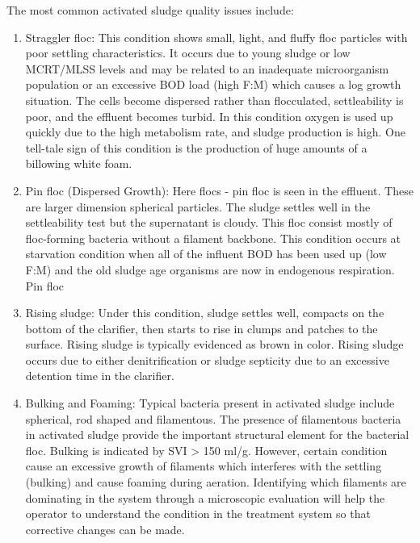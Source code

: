 \begin{itemize}


The most common activated sludge quality issues include:
\begin{enumerate}[1.]
\item Straggler floc:  This condition shows small, light, and fluffy floc particles with poor settling characteristics. It occurs due to young sludge or low MCRT/MLSS levels and may be related to an inadequate microorganism population or an excessive BOD load (high F:M) which causes a log growth situation. The cells become dispersed rather than flocculated, settleability is poor, and the effluent becomes turbid. In this condition oxygen is used up quickly due to the high metabolism rate, and sludge production is high. One tell-tale sign of this condition is the production of huge amounts of a billowing white foam.

\item Pin floc (Dispersed Growth):  Here flocs - pin floc is seen in the effluent. These are larger dimension spherical particles.  The sludge settles well in the settleability test but the supernatant is cloudy. This floc consist mostly of floc-forming bacteria without a filament backbone.  This condition occurs at starvation condition when all of the influent BOD has been used up (low F:M) and the old sludge age organisms are now in endogenous respiration.  Pin floc 

\item Rising sludge: Under this condition, sludge settles well, compacts on the bottom of the clarifier, then starts to rise in clumps and patches to the surface.  Rising sludge is typically evidenced as brown in color.  Rising sludge occurs due to either denitrification or sludge septicity due to an excessive detention time in the clarifier.  

\item Bulking and Foaming:  Typical bacteria present in activated sludge include spherical, rod shaped and filamentous.  The presence of filamentous bacteria in activated sludge provide the important structural element for the bacterial floc.  Bulking is indicated by SVI > 150 ml/g. However, certain condition cause an excessive growth of filaments which interferes with the settling (bulking) and cause foaming during aeration.   Identifying which filaments are dominating in the system through a microscopic evaluation will help the operator to understand the condition in the treatment system so that corrective changes can be made.\\


\end{enumerate}
\end{itemize}
